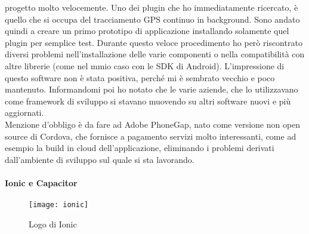 progetto molto velocemente. Uno dei plugin che ho immediatamente ricercato, è quello che si occupa del tracciamento
GPS continuo in \gls{background}. Sono andato quindi a creare un primo prototipo di applicazione installando solamente
quel plugin per semplice test. Durante questo veloce procedimento ho però riscontrato diversi problemi
nell'installazione delle varie componenti o nella compatibilità con altre librerie (come nel mmio caso con le
\gls{SDK} di Android). L'impressione di questo software non è stata positiva, perché mi è sembrato vecchio e poco
mantenuto. Informandomi poi ho notato che le varie aziende, che lo utilizzavano come framework di sviluppo si stavano
muovendo su altri software nuovi e più aggiornati.\\
Menzione d'obbligo è da fare ad Adobe PhoneGap, nato come versione non \gls{open source} di Cordova, che fornisce a
pagamento servizi molto interessanti, come ad esempio la build in cloud dell'applicazione, eliminando i problemi
derivati dall'ambiente di sviluppo sul quale si sta lavorando.

\paragraph{Ionic e Capacitor}

\begin{figure}[h]
	\begin{center}
		\texttt{[image: ionic]}
		\caption{Logo di Ionic}
	\end{center}
\end{figure}

